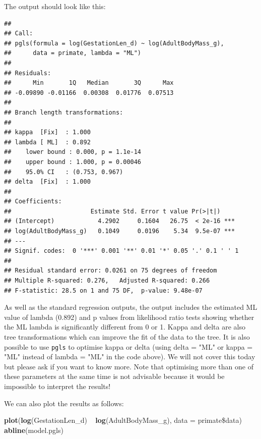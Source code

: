 \documentclass[12pt]{article}
\newcommand{\KeywordTok}[1]{\textcolor[rgb]{0.13,0.29,0.53}{\textbf{{#1}}}}
\newcommand{\DataTypeTok}[1]{\textcolor[rgb]{0.13,0.29,0.53}{{#1}}}
\newcommand{\StringTok}[1]{\textcolor[rgb]{0.31,0.60,0.02}{{#1}}}
\newcommand{\NormalTok}[1]{{#1}}
\begin{document}
\newpage
The output should look like this:

\begin{verbatim}
## 
## Call:
## pgls(formula = log(GestationLen_d) ~ log(AdultBodyMass_g), 
##      data = primate, lambda = "ML")
## 
## Residuals:
##      Min       1Q   Median       3Q      Max 
## -0.09890 -0.01166  0.00308  0.01776  0.07513 
## 
## Branch length transformations:
## 
## kappa  [Fix]  : 1.000
## lambda [ ML]  : 0.892
##    lower bound : 0.000, p = 1.1e-14
##    upper bound : 1.000, p = 0.00046
##    95.0% CI   : (0.753, 0.967)
## delta  [Fix]  : 1.000
## 
## Coefficients:
##                      Estimate Std. Error t value Pr(>|t|)    
## (Intercept)            4.2902     0.1604   26.75  < 2e-16 ***
## log(AdultBodyMass_g)   0.1049     0.0196    5.34  9.5e-07 ***
## ---
## Signif. codes:  0 '***' 0.001 '**' 0.01 '*' 0.05 '.' 0.1 ' ' 1
## 
## Residual standard error: 0.0261 on 75 degrees of freedom
## Multiple R-squared: 0.276,   Adjusted R-squared: 0.266 
## F-statistic: 28.5 on 1 and 75 DF,  p-value: 9.48e-07
\end{verbatim}

As well as the standard regression outputs, the output includes the estimated ML value of lambda (0.892) and p values from likelihood ratio tests showing whether the ML lambda is significantly different from 0 or 1. Kappa and delta are also tree transformations which can improve the fit of the data to the tree. It is also possible to use \texttt{pgls} to optimise kappa or delta (using delta = "ML" or kappa = "ML" instead of lambda = "ML" in the code above). We will not cover this today but please ask if you want to know more. Note that optimising more than one of these parameters at the same time is not advisable because it would be impossible to interpret the results!

\newpage
We can also plot the results as follows:

\begin{snugshade}
\begin{Highlighting}[]
\KeywordTok{plot}\NormalTok{(}\KeywordTok{log}\NormalTok{(GestationLen_d) ~}\StringTok{ }\KeywordTok{log}\NormalTok{(AdultBodyMass_g), }\DataTypeTok{data =} \NormalTok{primate\$data)}
\KeywordTok{abline}\NormalTok{(model.pgls)}
\end{Highlighting}
\end{snugshade}
\end{document}
